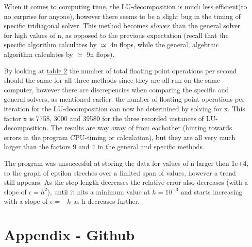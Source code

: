 \documentclass[11pt,a4paper,notitlepage]{article}
\begin{document}
When it comes to computing time, the LU-decomposition is much less efficient(to no surprise for anyone), however there seems to be a slight bug in the timing of specific tridiagonal solver. This method becomes $slower$ than the general solver for high values of n, as opposed to the previous expectation (recall that the specific algorithm calculates by $\simeq$ 4n flops, while the general, algebraic algorithm calculates by $\simeq$ 9n flops).
	
By looking at \hyperref[table:flops-per-sec]{table 2} the number of total floating point operations per second should the same for all three methods since they are all run on the same computer, however there are discrepencies when comparing the specific and general solvers, as mentioned earlier. the number of floating point operations per iteration for the LU-decomposition can now be determined by solving for x. This factor x is 7758, 3000 and 39580 for the three recorded instances of LU-decomposition. The results are way away of from eachother (hinting towards errors in the program CPU-timing or calculation), but they are all very much larger than the factors 9 and 4 in the general and specific methods.

The program was unsuccesful at storing the data for values of n larger then 1e+4, so the graph of epsilon streches over a limited span of values, however a trend still appears. As the step-length decreases the relative error also decreases (with a slope of $\epsilon = h^2$), until it hits a minimum value at $h=10^{-3}$ and starts increasing with a slope of $\epsilon = -h$ as h decreases further.

\section{Appendix - Github}
\label{section:github}
\end{document}
